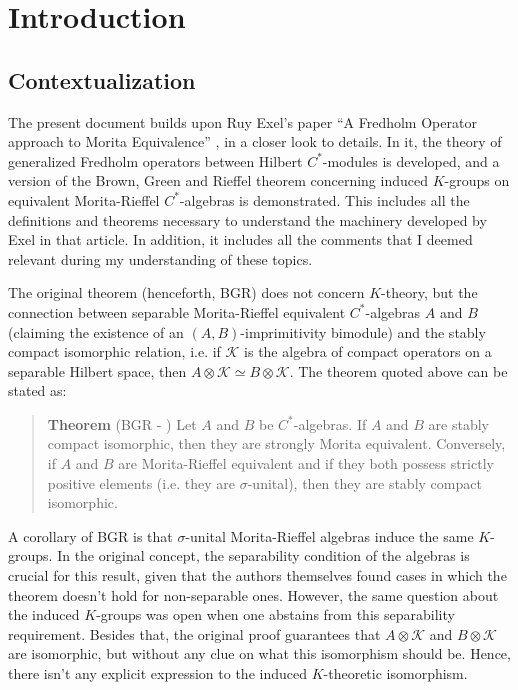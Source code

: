 \chapter*{Introduction}

\section*{Contextualization}

The present document builds upon Ruy Exel's paper ``A Fredholm Operator approach to Morita Equivalence'' \cite{exel7fredholm}, in a closer look to details. In it, the theory of generalized Fredholm operators between Hilbert $C^*$-modules is developed, and a version of the Brown, Green and Rieffel theorem concerning induced $K$-groups on equivalent Morita-Rieffel $C^*$-algebras is demonstrated. This includes all the definitions and theorems necessary to understand the machinery developed by Exel in that article. In addition, it includes all the comments that I deemed relevant during my understanding of these topics.

The original theorem (henceforth, BGR) does not concern $K$-theory, but the connection between separable Morita-Rieffel equivalent $C^*$-algebras $A$ and $B$ (claiming the existence of an $(A,B)$-imprimitivity bimodule) and the stably compact isomorphic relation, i.e. if $\mathscr K$ is the algebra of compact operators on a separable Hilbert space, then $A\otimes \mathscr K \simeq B\otimes \mathscr K$. The theorem quoted above can be stated as:
\begin{quote}
\textbf{Theorem} (BGR - \cite[Theorem 1.2]{brown1977morita}) 
Let $A$ and $B$ be $C^*$-algebras. If $A$ and $B$ are stably compact isomorphic, then they are strongly Morita equivalent. Conversely, if $A$ and $B$ are Morita-Rieffel equivalent and if they both possess strictly positive elements (i.e. they are $\sigma$-unital), then they are stably compact isomorphic.
\end{quote}
A corollary of BGR is that $\sigma$-unital Morita-Rieffel algebras induce the same $K$-groups. In the original concept, the separability condition of the algebras is crucial for this result, given that the authors themselves found cases in which the theorem doesn't hold for non-separable ones. However, the same question about the induced $K$-groups was open when one abstains from this separability requirement. Besides that, the original proof guarantees that $A\otimes \mathscr K$ and $B \otimes \mathscr K$ are isomorphic, but without any clue on what this isomorphism should be. Hence, there isn't any explicit expression to the induced $K$-theoretic isomorphism.

